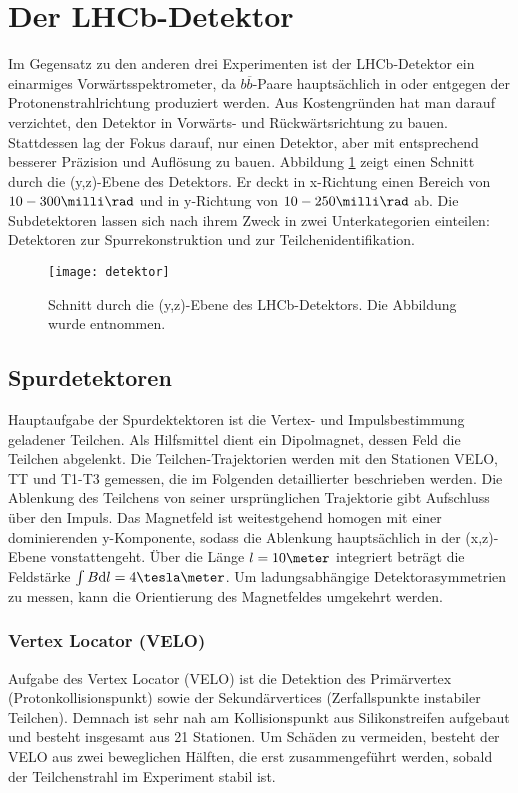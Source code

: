 \section{Der LHCb-Detektor}
Im Gegensatz zu den anderen drei Experimenten ist der LHCb-Detektor ein einarmiges Vorwärtsspektrometer, da $b\overline{b}$-Paare hauptsächlich in oder entgegen der Protonenstrahlrichtung produziert werden. Aus Kostengründen hat man darauf verzichtet, den Detektor in Vorwärts- und Rückwärtsrichtung zu bauen. Stattdessen lag der Fokus darauf, nur einen Detektor, aber mit entsprechend besserer Präzision und Auflösung zu bauen. Abbildung \ref{fig:detektor} zeigt einen Schnitt durch die (y,z)-Ebene des Detektors. Er deckt in x-Richtung einen Bereich von $10-300\milli\rad$ und in y-Richtung von $10-250\milli\rad$ ab. Die Subdetektoren lassen sich nach ihrem Zweck in zwei Unterkategorien einteilen: Detektoren zur Spurrekonstruktion und zur Teilchenidentifikation.

\begin{figure}[hptb]
\centering
\texttt{[image: detektor]}
\caption{Schnitt durch die (y,z)-Ebene des LHCb-Detektors. Die Abbildung wurde \cite{detector} entnommen.}
\label{fig:detektor}
\end{figure}


\subsection{Spurdetektoren}
Hauptaufgabe der Spurdektektoren ist die Vertex- und Impulsbestimmung geladener Teilchen. Als Hilfsmittel dient ein Dipolmagnet, dessen Feld die Teilchen abgelenkt. Die Teilchen-Trajektorien werden mit den Stationen VELO, TT und T1-T3 gemessen, die im Folgenden detaillierter beschrieben werden. Die Ablenkung des Teilchens von seiner ursprünglichen Trajektorie gibt Aufschluss über den Impuls. Das Magnetfeld ist weitestgehend homogen mit einer dominierenden y-Komponente, sodass die Ablenkung hauptsächlich in der (x,z)-Ebene vonstattengeht. Über die Länge $l=10\meter$ integriert beträgt die Feldstärke $\int B\mathrm{d}l = 4\tesla\meter$. Um ladungsabhängige Detektorasymmetrien zu messen, kann die Orientierung des Magnetfeldes umgekehrt werden. \cite{thesis_linn}

\subsubsection{Vertex Locator (VELO)}
Aufgabe des Vertex Locator (VELO) ist die Detektion des Primärvertex (Protonkollisionspunkt) sowie der Sekundärvertices (Zerfallspunkte instabiler Teilchen). Demnach ist sehr nah am Kollisionspunkt aus Silikonstreifen aufgebaut und besteht insgesamt aus 21 Stationen. Um Schäden zu vermeiden, besteht der VELO aus zwei beweglichen Hälften, die erst zusammengeführt werden, sobald der Teilchenstrahl im Experiment stabil ist.

